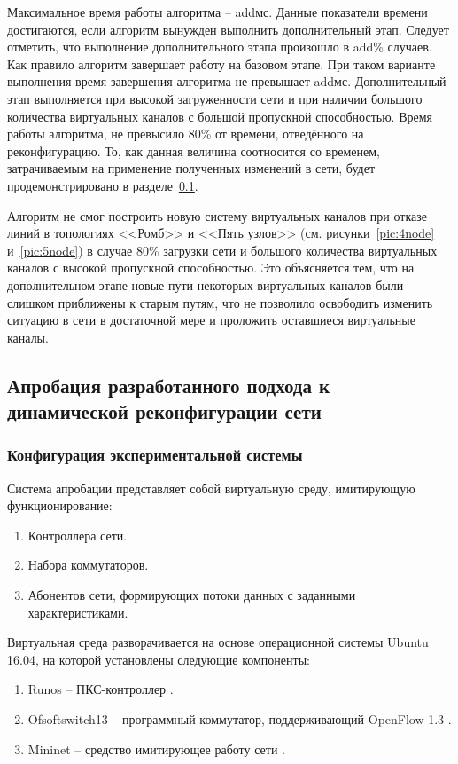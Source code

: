 \documentclass[12pt, a4paper]{article}
\begin{document}
Максимальное время работы алгоритма – addмс. Данные показатели времени достигаются, если алгоритм вынужден выполнить дополнительный этап. Следует отметить, что выполнение дополнительного этапа произошло в add\% случаев. Как правило алгоритм завершает работу на базовом этапе. При таком варианте выполнения время завершения алгоритма не превышает addмс. Дополнительный этап выполняется при высокой загруженности сети и при наличии большого количества виртуальных каналов с большой пропускной способностью. Время работы алгоритма, не превысило 80\% от времени, отведённого на реконфигурацию. То, как данная величина соотносится со временем, затрачиваемым на применение полученных изменений в сети, будет продемонстрировано в разделе~\ref{subsec:approbation}.

Алгоритм не смог построить новую систему виртуальных каналов при отказе линий в топологиях <<Ромб>> и <<Пять узлов>> (см. рисунки~\ref{pic:4node} и~\ref{pic:5node}) в случае 80\% загрузки сети и большого количества виртуальных каналов с высокой пропускной способностью. Это объясняется тем, что на дополнительном этапе новые пути некоторых виртуальных каналов были слишком приближены к старым путям, что не позволило освободить изменить ситуацию в сети в достаточной мере и проложить оставшиеся виртуальные каналы. 

\subsection{Апробация разработанного подхода к динамической реконфигурации сети} \label{subsec:approbation}
\subsubsection{Конфигурация экспериментальной системы}
Система апробации представляет собой виртуальную среду, имитирующую
функционирование:
\begin{enumerate}
	\item Контроллера сети.
	\item Набора коммутаторов.
	\item Абонентов сети, формирующих потоки данных с заданными характеристиками.
\end{enumerate}

Виртуальная среда разворачивается на основе операционной системы Ubuntu 16.04,
на которой установлены следующие компоненты:
\begin{enumerate}
	\item Runos -- ПКС-контроллер \cite{runos}.
	\item Ofsoftswitch13 -- программный коммутатор, поддерживающий OpenFlow 1.3 \cite{ofsoftswitch}.
	\item Mininet -- средство имитирующее работу сети \cite{mininet}.
\end{enumerate}
\end{document}
